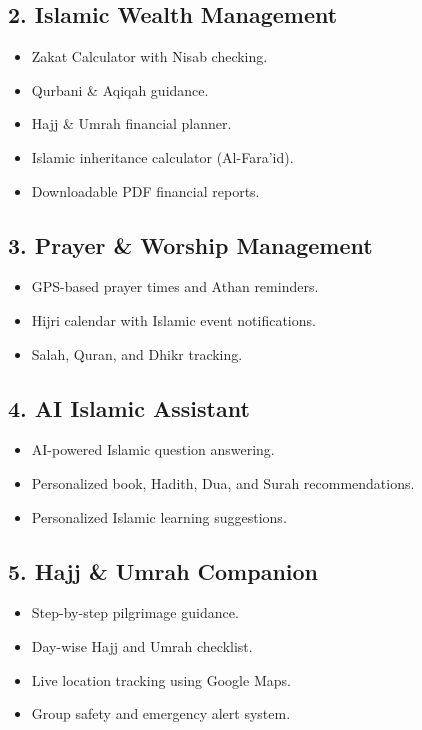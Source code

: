 \documentclass[12pt,a4paper]{article}
\begin{document}
\subsection*{2. Islamic Wealth Management}
\begin{itemize}[leftmargin=2em, label=\textbullet, itemsep=3pt]
  \item Zakat Calculator with Nisab checking.
  \item Qurbani \& Aqiqah guidance.
  \item Hajj \& Umrah financial planner.
  \item Islamic inheritance calculator (Al-Fara'id).
  \item Downloadable PDF financial reports.
\end{itemize}

\subsection*{3. Prayer \& Worship Management}
\begin{itemize}[leftmargin=2em, label=\textbullet, itemsep=3pt]
  \item GPS-based prayer times and Athan reminders.
  \item Hijri calendar with Islamic event notifications.
  \item Salah, Quran, and Dhikr tracking.
\end{itemize}

\subsection*{4. AI Islamic Assistant}
\begin{itemize}[leftmargin=2em, label=\textbullet, itemsep=3pt]
  \item AI-powered Islamic question answering.
  \item Personalized book, Hadith, Dua, and Surah recommendations.
  \item Personalized Islamic learning suggestions.
\end{itemize}

\subsection*{5. Hajj \& Umrah Companion}
\begin{itemize}[leftmargin=2em, label=\textbullet, itemsep=3pt]
  \item Step-by-step pilgrimage guidance.
  \item Day-wise Hajj and Umrah checklist.
  \item Live location tracking using Google Maps.
  \item Group safety and emergency alert system.
\end{itemize}
\end{document}
